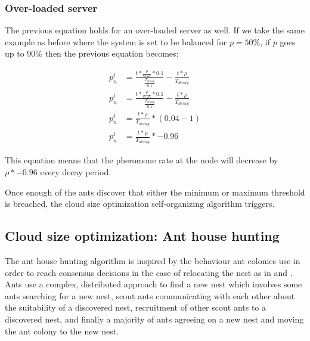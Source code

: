 \subsubsection{Over-loaded server}

The previous equation holds for an over-loaded server as well. If we take the same example as before where the system is set to be balanced for $p = 50\%$, if $p$ goes up to $90\%$ then the previous equation becomes:

\begin{equation}
\begin{aligned}
p^{t}_{n} &= \frac{t *  \frac{\rho}{0.25} * 0.1}{\frac{T_{decay}}{0.1}} - \frac{t *  \rho}{T_{decay}} \\
p^{t}_{n} &= \frac{t *  \frac{\rho}{0.25} * 0.1}{\frac{T_{decay}}{0.1}} - \frac{t *  \rho}{T_{decay}} \\
p^{t}_{n} &= \frac{t * \rho}{T_{decay}} * (0.04 - 1) \\
p^{t}_{n} &= \frac{t * \rho}{T_{decay}} * -0.96
\end{aligned}
\end{equation}

This equation means that the pheromone rate at the node will decrease by $\rho * -0.96$ every decay period.

Once enough of the ants discover that either the minimum or maximum threshold is breached, the cloud size optimization self-organizing algorithm triggers.

\subsection{Cloud size optimization: Ant house hunting}

The ant house hunting algorithm is inspired by the behaviour ant colonies use in order to reach consensus decisions in the case of relocating the nest as in \cite{selforg:antreloc} and \cite{selforg:antreloc2}. Ants use a complex, distributed approach to find a new nest which involves some ants searching for a new nest, scout ants communicating with each other about the suitability of a discovered nest, recruitment of other scout ants to a discovered nest, and finally a majority of ants agreeing on a new nest and moving the ant colony to the new nest.

